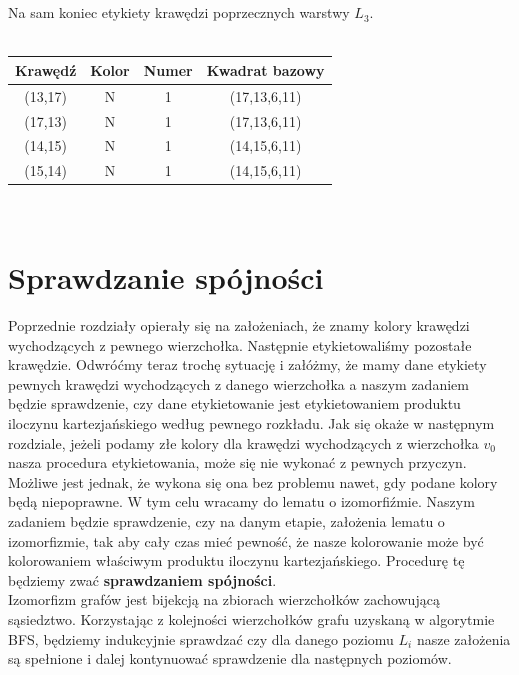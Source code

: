 \documentclass[12pt,a4paper,titlepage]{article}
\newcommand\tab[1][1cm]{\hspace*{#1}}
\begin{document}
\\
\\
Na sam koniec etykiety krawędzi poprzecznych warstwy $L_3$.\\
\\
\begin{tabular}{|c|c|c|c|}\hline
Krawędź & Kolor & Numer & Kwadrat bazowy \\ \hline
(13,17) & N & 1 & (17,13,6,11)\\ \hline
(17,13) & N & 1 & (17,13,6,11)\\ \hline
(14,15) & N & 1 & (14,15,6,11)\\ \hline
(15,14) & N & 1 & (14,15,6,11)\\ \hline
\end{tabular}
\\
\newpage
\section{Sprawdzanie spójności}
Poprzednie rozdziały opierały się na założeniach, że znamy kolory krawędzi wychodzących z pewnego wierzchołka. Następnie etykietowaliśmy pozostałe krawędzie. Odwróćmy teraz trochę sytuację i załóżmy, że mamy dane etykiety pewnych krawędzi wychodzących z danego wierzchołka a naszym zadaniem będzie sprawdzenie, czy dane etykietowanie jest etykietowaniem produktu iloczynu kartezjańskiego według pewnego rozkładu. Jak się okaże w następnym rozdziale, jeżeli podamy złe kolory dla krawędzi wychodzących z wierzchołka $v_0$ nasza procedura etykietowania, może się nie wykonać z pewnych przyczyn. Możliwe jest jednak, że wykona się ona bez problemu nawet, gdy podane kolory będą niepoprawne. W tym celu wracamy do lematu o izomorfiźmie. Naszym zadaniem będzie sprawdzenie, czy na danym etapie, założenia lematu o izomorfizmie, tak aby cały czas mieć pewność, że nasze kolorowanie może być kolorowaniem właściwym produktu iloczynu kartezjańskiego. Procedurę tę będziemy zwać \textbf{sprawdzaniem spójności}.\\
\tab[0.6cm]Izomorfizm grafów jest bijekcją na zbiorach wierzchołków zachowującą sąsiedztwo. Korzystając z kolejności wierzchołków grafu uzyskaną w algorytmie BFS, będziemy indukcyjnie sprawdzać czy dla danego poziomu $L_i$ nasze założenia są spełnione i dalej kontynuować sprawdzenie dla następnych poziomów. \\
\end{document}
